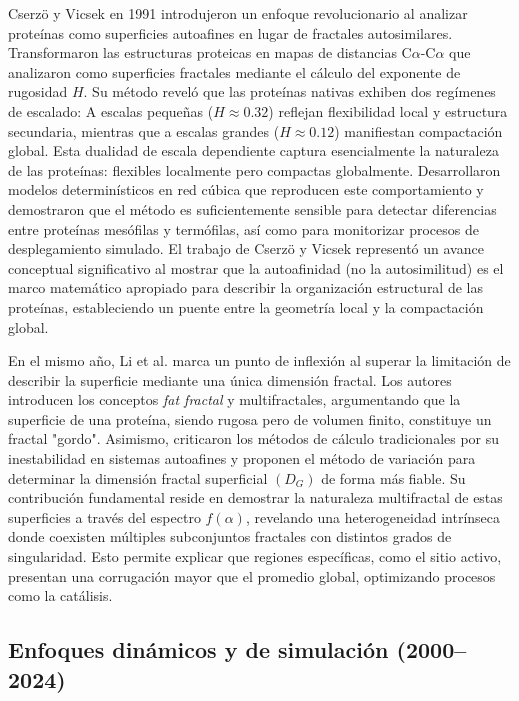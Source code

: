Cserzö y Vicsek en 1991 \cite{Cserzo1991} introdujeron un enfoque revolucionario al analizar proteínas como superficies autoafines en lugar de fractales autosimilares. Transformaron las estructuras proteicas en mapas de distancias C$\alpha$-C$\alpha$ que analizaron como superficies fractales mediante el cálculo del exponente de rugosidad $H$. Su método reveló que las proteínas nativas exhiben dos regímenes de escalado: A escalas pequeñas ($H \approx 0.32$) reflejan flexibilidad local y estructura secundaria, mientras que a escalas grandes ($H \approx 0.12$) manifiestan compactación global. Esta dualidad de escala dependiente captura esencialmente la naturaleza de las proteínas: flexibles localmente pero compactas globalmente. Desarrollaron modelos determinísticos en red cúbica que reproducen este comportamiento y demostraron que el método es suficientemente sensible para detectar diferencias entre proteínas mesófilas y termófilas, así como para monitorizar procesos de desplegamiento simulado. El trabajo de Cserzö y Vicsek representó un avance conceptual significativo al mostrar que la autoafinidad (no la autosimilitud) es el marco matemático apropiado para describir la organización estructural de las proteínas, estableciendo un puente entre la geometría local y la compactación global.


En el mismo año, Li et al. \cite{HouqiangLi1991} marca un punto de inflexión al superar la limitación de describir la superficie mediante una única dimensión fractal. Los autores introducen los conceptos \textit{fat fractal} y multifractales, argumentando que la superficie de una proteína, siendo rugosa pero de volumen finito, constituye un fractal "gordo". Asimismo, criticaron los métodos de cálculo tradicionales por su inestabilidad en sistemas autoafines y proponen el método de variación para determinar la dimensión fractal superficial $(D_G)$ de forma más fiable. Su contribución fundamental reside en demostrar la naturaleza multifractal de estas superficies a través del espectro $f(\alpha)$, revelando una heterogeneidad intrínseca donde coexisten múltiples subconjuntos fractales con distintos grados de singularidad. Esto permite explicar que regiones específicas, como el sitio activo, presentan una corrugación mayor que el promedio global, optimizando procesos como la catálisis. 

\subsection{Enfoques dinámicos y de simulación (2000--2024)}


